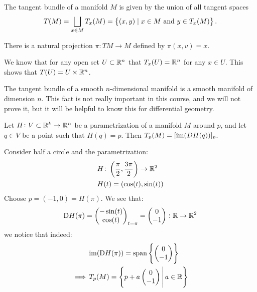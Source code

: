 \documentclass[11pt,a4paper]{article}
\begin{document}
\begin{definition}
  The tangent bundle of a manifold $M$ is given by
  the union of all tangent spaces
  \begin{align*}
    T(M) =
    \bigsqcup_{x \in M} T_x(M) =
    \left\{(x,y) \mid x \in M \text{ and } y \in T_{x}(M)\right\}.
  \end{align*}
\end{definition}
\begin{remark}
  There is a natural projection $\pi \colon TM \to M$
  defined by $\pi(x,v) = x$.
\end{remark}
\begin{example}
  We know that for any open set $U \subset \mathbb{R}^n$
  that $T_x(U) = \mathbb{R}^n$ for any $x \in U$.
  This shows that $T(U) = U \times \mathbb{R}^n$.
\end{example}
\begin{remark}
  The tangent bundle of a smooth $n$-dimensional manifold
  is a smooth manifold of dimension $n$.
  This fact is not really important in this course,
  and we will not prove it, but it will be helpful to know this
  for differential geometry.
\end{remark}

\begin{definition}
  \label{def:tangent-space-with-parameterization}
  Let $H \colon V \subset \mathbb{R}^k \to \mathbb{R}^n$ be a parametrization
  of a manifold $M$ around $p$, and let $q \in V$ be a point such that
  $H(q) = p$.
  Then $T_p(M) = [\operatorname{im}(DH(q))]_p$.
\end{definition}
\begin{example}
  Consider half a circle and the parametrization:
  \begin{align*}
    &H \colon \left(\frac{\pi}{2}, \frac{3\pi}{2}\right) \to \mathbb{R}^2 \\
    &H(t) = (\cos(t), \sin(t))
  \end{align*}
  Choose $p = (-1,0) = H(\pi)$. We see that:
  \[
    \mathrm{D} H(\pi) = 
    \begin{pmatrix}
      -\sin(t)\\
      \cos(t)\\
    \end{pmatrix}_{t=\pi} = 
    \begin{pmatrix}
      0\\
      -1\\
    \end{pmatrix} \colon \mathbb{R} \to \mathbb{R}^2
  \]
  we notice that indeed:
  \begin{align*}
    &\operatorname{im}(\mathrm{D} H(\pi)) = \operatorname{span}
    \left\{\begin{pmatrix}
      0\\
      -1\\
    \end{pmatrix}\right\} \\
    \implies &\,T_p(M) =
    \left\{p + a\begin{pmatrix}
      0\\
      -1\\
    \end{pmatrix} \,\middle\vert\, a \in \mathbb{R} \right\}
  \end{align*}
\end{example}
\end{document}
